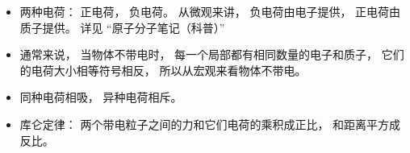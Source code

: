 
\begin{issues}
\issueDraft
\end{issues}

\begin{itemize}
\item 两种电荷： 正电荷， 负电荷。 从微观来讲， 负电荷由电子提供， 正电荷由质子提供。 详见 “原子分子笔记（科普）”
\item 通常来说， 当物体不带电时， 每一个局部都有相同数量的电子和质子， 它们的电荷大小相等符号相反， 所以从宏观来看物体不带电。
\item 同种电荷相吸， 异种电荷相斥。
\item 库仑定律： 两个带电粒子之间的力和它们电荷的乘积成正比， 和距离平方成反比。
\end{itemize}
